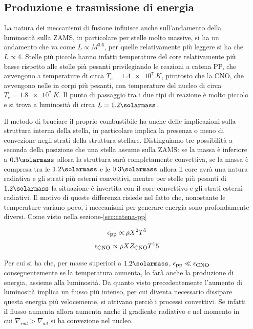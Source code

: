 \subsection{Produzione e trasmissione di energia}\label{sec:prod-tras-energia}

La natura dei meccanismi di fusione influisce anche sull'andamento della luminosità sulla ZAMS, in particolare per stelle molto massive, si ha un andamento che va come $L \propto M^{3.6}$, per quelle relativamente più leggere si ha che $L \propto 4$.  Stelle più piccole hanno infatti temperature del core relativamente più basse rispetto alle stelle più pesanti privilegiando le reazioni a catena PP, che avvengono a temperature di circa $T_e = \SI{1.4e7}{K}$, piuttosto che la CNO, che avvengono nelle in corpi più pesanti, con temperature del nucleo di circa $T_e = \SI{1.8e7}{K}$. Il punto di passaggio tra i due tipi di reazione è molto piccolo e si trova a luminosità di circa $L = 1.2 \si{\solarmass}$.

Il metodo di bruciare il proprio combustibile ha anche delle implicazioni sulla struttura interna della stella, in particolare implica la presenza o meno di convezione negli strati della struttura stellare. Distinguiamo tre possibilità a seconda della posizione che una stella assume sulla ZAMS: se la massa è inferiore a $0.3 \si{\solarmass}$ allora la struttura sarà completamente convettiva, se la massa è compresa tra le $1.2 \si{\solarmass}$ e le $0.3 \si{\solarmass}$ allora il core avrà una natura radiativa e gli strati più esterni convettivi, mentre per stelle più pesanti di $1.2 \si{\solarmass}$ la situazione è invertita con il core convettivo e gli strati esterni radiativi. Il motivo di queste differenza risiede nel fatto che, nonostante le temperature variano poco, i meccanismi per generare energia sono profondamente diversi. Come visto nella sezione-\ref{sec:catena-pp}

\[
    \epsilon_{\mbox{\footnotesize{pp}}} \propto \rho X^2 T^5
\]
\[
    \epsilon_{\mbox{\footnotesize{CNO}}} \propto \rho X Z_{\mbox{\footnotesize{CNO}}} T^15
\]

Per cui si ha che, per masse superiori a $1.2 \si{\solarmass}$, $\epsilon_{\mbox{\footnotesize{pp}}} \ll \epsilon_{\mbox{\footnotesize{CNO}}}$ conseguentemente se la temperatura aumenta, lo farà anche la produzione di energia, assieme alla luminosità. Da quanto visto precedentemente l'aumento di luminosità implica un flusso più intenso, per cui diventa necessario dissipare questa energia più velocemente, si attivano perciò i processi convettivi. Se infatti il flusso aumenta allora aumenta anche il gradiente radiativo e nel momento in cui $\nabla_{rad} > \nabla_{ad}$ si ha convezione nel nucleo.

